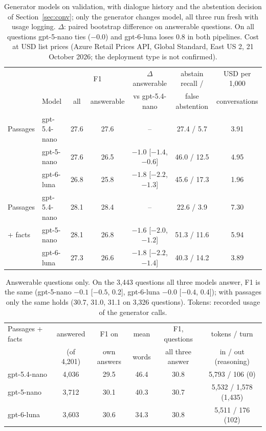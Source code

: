 \documentclass[11pt,a4paper]{article}
\begin{document}
\begin{table}[H]
\centering\footnotesize
\begin{tabular}{llccccc}
\toprule
 & & \multicolumn{2}{c}{F1} & $\Delta$ answerable & abstain recall / & USD per 1,000 \\
 & Model & all & answerable & vs gpt-5.4-nano & false abstention & conversations \\
\midrule
Passages & gpt-5.4-nano & 27.6 & 27.6 & -- & 27.4 / \phantom{0}5.7 & 3.91 \\
 & gpt-5-nano & 27.6 & 26.5 & $-1.0$ [$-1.4$, $-0.6$] & 46.0 / 12.5 & 4.95 \\
 & gpt-6-luna & 26.8 & 25.8 & $-1.8$ [$-2.2$, $-1.3$] & 45.6 / 17.3 & 1.96 \\
\midrule
Passages & gpt-5.4-nano & 28.1 & 28.4 & -- & 22.6 / \phantom{0}3.9 & 7.30 \\
+ facts & gpt-5-nano & 28.1 & 26.8 & $-1.6$ [$-2.0$, $-1.2$] & 51.3 / 11.6 & 5.94 \\
 & gpt-6-luna & 27.3 & 26.6 & $-1.8$ [$-2.2$, $-1.4$] & 40.3 / 14.2 & 3.89 \\
\bottomrule
\end{tabular}
\caption{Generator models on validation, with dialogue history and the abstention decision of
Section~\ref{sec:conv}; only the generator changes model, all three run fresh with usage logging.
$\Delta$: paired bootstrap difference on answerable questions. On all questions gpt-5-nano ties
($-0.0$) and gpt-6-luna loses 0.8 in both pipelines. Cost at USD list prices (Azure Retail Prices
API, Global Standard, East US 2, 21 October 2026; the deployment type is not confirmed).}
\label{tab:models}
\end{table}

\begin{table}[H]
\centering\footnotesize
\begin{tabular}{lccccc}
\toprule
Passages + facts & answered & F1 on & mean & F1, questions & tokens / turn \\
 & (of 4,201) & own answers & words & all three answer & in / out (reasoning) \\
\midrule
gpt-5.4-nano & 4,036 & 29.5 & 46.4 & 30.8 & 5,793 / 106 (0) \\
gpt-5-nano & 3,712 & 30.1 & 40.3 & 30.7 & 5,532 / 1,578 (1,435) \\
gpt-6-luna & 3,603 & 30.6 & 34.3 & 30.8 & 5,511 / 176 (102) \\
\bottomrule
\end{tabular}
\caption{Answerable questions only. On the 3,443 questions all three models answer, F1 is the
same (gpt-5-nano $-0.1$ [$-0.5$, 0.2], gpt-6-luna $-0.0$ [$-0.4$, 0.4]); with passages only the
same holds (30.7, 31.0, 31.1 on 3,326 questions). Tokens: recorded usage of the generator calls.}
\label{tab:models2}
\end{table}
\end{document}
